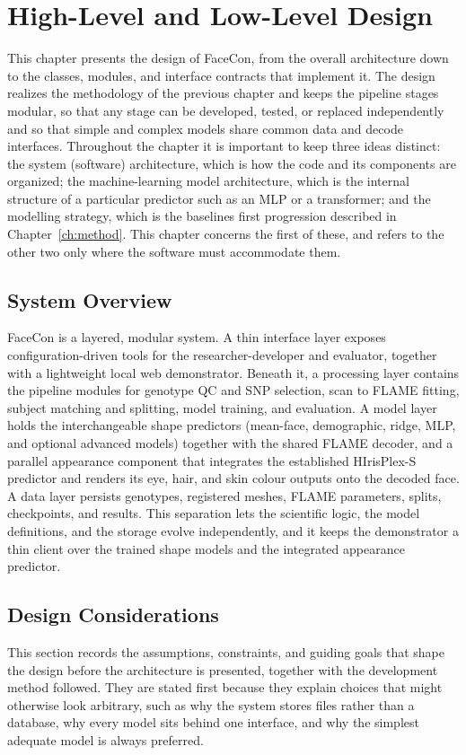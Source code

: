 \chapter{High-Level and Low-Level Design}
\label{ch:design}
This chapter presents the design of FaceCon, from the overall architecture down to the classes, modules, and interface contracts that implement it. The design realizes the methodology of the previous chapter and keeps the pipeline stages modular, so that any stage can be developed, tested, or replaced independently and so that simple and complex models share common data and decode interfaces. Throughout the chapter it is important to keep three ideas distinct: the system (software) architecture, which is how the code and its components are organized; the machine-learning model architecture, which is the internal structure of a particular predictor such as an MLP or a transformer; and the modelling strategy, which is the baselines first progression described in Chapter~\ref{ch:method}. This chapter concerns the first of these, and refers to the other two only where the software must accommodate them.

\section{System Overview}
FaceCon is a layered, modular system. A thin interface layer exposes configuration-driven tools for the researcher-developer and evaluator, together with a lightweight local web demonstrator. Beneath it, a processing layer contains the pipeline modules for genotype QC and SNP selection, scan to FLAME fitting, subject matching and splitting, model training, and evaluation. A model layer holds the interchangeable shape predictors (mean-face, demographic, ridge, MLP, and optional advanced models) together with the shared FLAME decoder, and a parallel appearance component that integrates the established HIrisPlex-S predictor and renders its eye, hair, and skin colour outputs onto the decoded face. A data layer persists genotypes, registered meshes, FLAME parameters, splits, checkpoints, and results. This separation lets the scientific logic, the model definitions, and the storage evolve independently, and it keeps the demonstrator a thin client over the trained shape models and the integrated appearance predictor.

\section{Design Considerations}
This section records the assumptions, constraints, and guiding goals that shape the design before the architecture is presented, together with the development method followed. They are stated first because they explain choices that might otherwise look arbitrary, such as why the system stores files rather than a database, why every model sits behind one interface, and why the simplest adequate model is always preferred.

